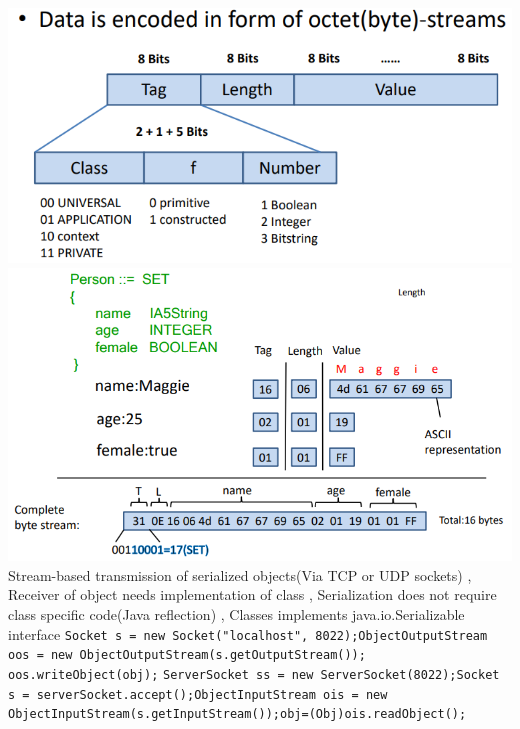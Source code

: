 \includegraphics[width=.45\linewidth]{chap2_4.png}
\includegraphics[width=.45\linewidth]{chap2_5.png}
Stream-based transmission of serialized objects(Via TCP or UDP sockets)
, Receiver of object needs implementation of class
, Serialization does not require class specific code(Java reflection)
, Classes implements java.io.Serializable interface
\lstinline{Socket s = new Socket("localhost", 8022);ObjectOutputStream oos = new ObjectOutputStream(s.getOutputStream()); oos.writeObject(obj);}
\lstinline{ServerSocket ss = new ServerSocket(8022);Socket s = serverSocket.accept();ObjectInputStream ois = new ObjectInputStream(s.getInputStream());obj=(Obj)ois.readObject();}